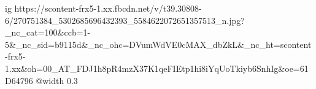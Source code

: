  
 
 
 
 

\ifcmt
  ig https://scontent-frx5-1.xx.fbcdn.net/v/t39.30808-6/270751384_5302685696432393_5584622072651357513_n.jpg?_nc_cat=100&ccb=1-5&_nc_sid=b9115d&_nc_ohc=DVumWdVE0cMAX_dbZkL&_nc_ht=scontent-frx5-1.xx&oh=00_AT_FDJ1h8pR4mzX37K1qeFIEtp1hi8iYqUoTkiyb6SnhIg&oe=61D64796
  @width 0.3
\fi
